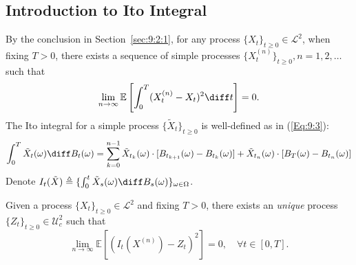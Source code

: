 \subsection{Introduction to Ito Integral}
By the conclusion in Section~\ref{sec:9:2:1}, for any process $\{X_t\}_{t\ge0}\in\mathcal{L}^2$,
when fixing $T>0$, there exists a sequence of simple processes $\{X_t^{(n)}\}_{t\ge0}, n=1,2,\ldots$ such that
\begin{equation}\label{Eq:10:2}
\lim_{n\to\infty}\mathbb{E}\left[
\int_0^T(X_t^{(n)}-X_t)^2\diff t
\right]=0.
\end{equation}
The Ito integral for a simple process $\{\tilde{X}_t\}_{t\ge0}$ is well-defined as in (\ref{Eq:9:3}):
\[
\int_0^T\tilde{X}_t(\omega)\diff B_t(\omega) = \sum_{k=0}^{n-1}\tilde{X}_{t_k}(\omega)\cdot[B_{t_{k+1}}(\omega) -B_{t_k}(\omega)] + \tilde{X}_{t_n}(\omega)\cdot[B_{T}(\omega) -B_{t_n}(\omega)]
\]
Denote $I_t(\tilde{X})\triangleq \{\int_0^t\tilde{X}_s(\omega)\diff B_s(\omega)\}_{\omega\in\Omega}$.

\begin{theorem}\label{The:10:2}
Given a process  $\{X_t\}_{t\ge0}\in\mathcal{L}^2$ and fixing $T>0$,
there exists an \emph{unique} process $\{Z_t\}_{t\ge0}\in\mathcal{U}_c^2$ such that 
\begin{equation}\label{Eq:10:2:2}
\lim_{n\to\infty}\mathbb{E}\left[
(I_t(X^{(n)})-Z_t)^2
\right]=0,\quad\forall t\in[0,T].
\end{equation}
\end{theorem}

